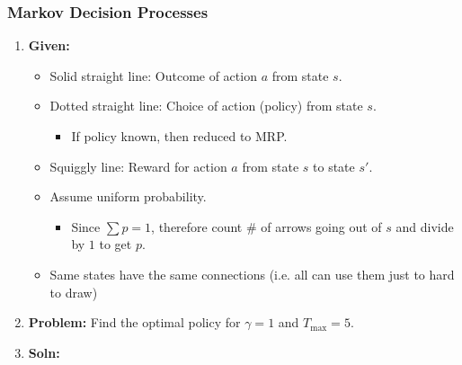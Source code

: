 \subsubsection{Markov Decision Processes}
\begin{example}
    \begin{enumerate}
        \item \textbf{Given:}
        \begin{itemize}
            \item Solid straight line: Outcome of action $a$ from state $s$.
            \item Dotted straight line: Choice of action (policy) from state $s$.
            \begin{itemize}
                \item If policy known, then reduced to MRP.
            \end{itemize}
            \item Squiggly line: Reward for action $a$ from state $s$ to state $s'$.
            \item Assume uniform probability. 
            \begin{itemize}
                \item Since $\sum p= 1$, therefore count \# of arrows going out of $s$ and divide by $1$ to get $p$.
            \end{itemize}
            \item Same states have the same connections (i.e. all can use them just to hard to draw)
        \end{itemize}
        \item \textbf{Problem:} Find the optimal policy for $\gamma=1$ and $T_{\max} = 5$.
        \item \textbf{Soln:}
    \end{enumerate}
\end{example}
\newpage

